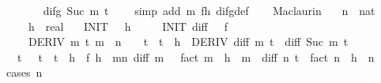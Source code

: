 \begin{isabellebody}
\ \ \ \ \ \ \isamarkupfalse%
\ {\isacartoucheopen}difg\ {\isacharparenleft}{\kern0pt}Suc\ m{\isacharparenright}{\kern0pt}\ t\ {\isacharequal}{\kern0pt}\ {}{\isacartoucheclose}\ \isamarkupfalse%
\ {\isacharparenleft}{\kern0pt}simp\ add{\isacharcolon}{\kern0pt}\ m\ f{\isacharunderscore}{\kern0pt}h\ difg{\isacharunderscore}{\kern0pt}def{\isacharparenright}{\kern0pt}\isanewline
\ \ \isamarkupfalse%
\isanewline
{}\isamarkupfalse%
%
\endisatagproof
{\isafoldproof}%
%
\isadelimproof
\isanewline
%
\endisadelimproof
\isanewline
{}\isamarkupfalse%
\ Maclaurin{}{\isacharcolon}{\kern0pt}\isanewline
\ \ \ n\ {\isacharcolon}{\kern0pt}{\isacharcolon}{\kern0pt}\ nat\isanewline
\ \ \ \ \ h\ {\isacharcolon}{\kern0pt}{\isacharcolon}{\kern0pt}\ real\isanewline
\ \ \ INIT{}{\isacharcolon}{\kern0pt}\ {\isachardoublequoteopen}{}\ {\isacharless}{\kern0pt}\ h{\isachardoublequoteclose}\isanewline
\ \ \ \ \ INIT{}{\isacharcolon}{\kern0pt}\ {\isachardoublequoteopen}diff\ {}\ {\isacharequal}{\kern0pt}\ f{\isachardoublequoteclose}\isanewline
\ \ \ \ \ DERIV{\isacharcolon}{\kern0pt}\ {\isachardoublequoteopen}{\isasymforall}m\ t{\isachardot}{\kern0pt}\ m\ {\isacharless}{\kern0pt}\ n\ {\isasymand}\ {}\ {\isasymle}\ t\ {\isasymand}\ t\ {\isasymle}\ h\ {\isasymlongrightarrow}\ DERIV\ {\isacharparenleft}{\kern0pt}diff\ m{\isacharparenright}{\kern0pt}\ t\ {\isacharcolon}{\kern0pt}{\isachargreater}{\kern0pt}\ diff\ {\isacharparenleft}{\kern0pt}Suc\ m{\isacharparenright}{\kern0pt}\ t{\isachardoublequoteclose}\isanewline
\ \ \ {\isachardoublequoteopen}{\isasymexists}t{\isachardot}{\kern0pt}\ {}\ {\isacharless}{\kern0pt}\ t\ {\isasymand}\ t\ {\isasymle}\ h\ {\isasymand}\ f\ h\ {\isacharequal}{\kern0pt}\ {\isacharparenleft}{\kern0pt}{\isasymSum}m{\isacharless}{\kern0pt}n{\isachardot}{\kern0pt}\ diff\ m\ {}\ {\isacharslash}{\kern0pt}\ {\isacharparenleft}{\kern0pt}fact\ m{\isacharparenright}{\kern0pt}\ {\isacharasterisk}{\kern0pt}\ h\ {\isacharcircum}{\kern0pt}\ m{\isacharparenright}{\kern0pt}\ {\isacharplus}{\kern0pt}\ diff\ n\ t\ {\isacharslash}{\kern0pt}\ fact\ n\ {\isacharasterisk}{\kern0pt}\ h\ {\isacharcircum}{\kern0pt}\ n{\isachardoublequoteclose}\isanewline
%
\isadelimproof
%
\endisadelimproof
%
\isatagproof
{}\isamarkupfalse%
\ {\isacharparenleft}{\kern0pt}cases\ n{\isacharparenright}{\kern0pt}\isanewline

\end{isabellebody}
